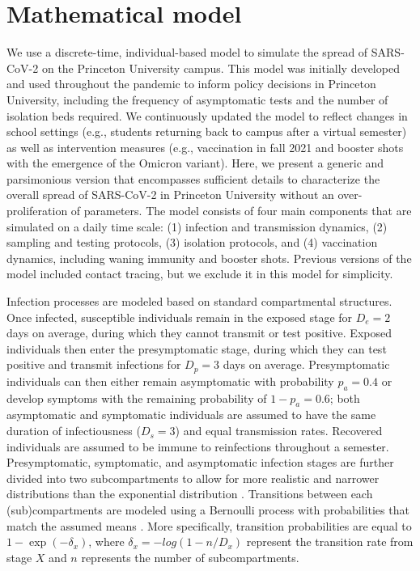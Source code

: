 \documentclass[12pt]{article}
\begin{document}
\section*{Mathematical model}

We use a discrete-time, individual-based model to simulate the spread of SARS-CoV-2 on the Princeton University campus.
This model was initially developed and used throughout the pandemic to inform policy decisions in Princeton University, including the frequency of asymptomatic tests and the number of isolation beds required.
We continuously updated the model to reflect changes in school settings (e.g., students returning back to campus after a virtual semester) as well as intervention measures (e.g., vaccination in fall 2021 and booster shots with the emergence of the Omicron variant).
Here, we present a generic and parsimonious version that encompasses sufficient details to characterize the overall spread of SARS-CoV-2 in Princeton University without an over-proliferation of parameters.
The model consists of four main components that are simulated on a daily time scale: (1) infection and transmission dynamics, (2) sampling and testing protocols, (3) isolation protocols, and (4) vaccination dynamics, including waning immunity and booster shots.
Previous versions of the model included contact tracing, but we exclude it in this model for simplicity.

Infection processes are modeled based on standard compartmental structures.
Once infected, susceptible individuals remain in the exposed stage for $D_e = 2$ days on average, during which they cannot transmit or test positive. 
Exposed individuals then enter the presymptomatic stage, during which they can test positive and transmit infections for $D_p = 3$ days on average.
Presymptomatic individuals can then either remain asymptomatic with probability $p_a = 0.4$ or develop symptoms with the remaining probability of $1-p_a = 0.6$; both asymptomatic and symptomatic individuals are assumed to have the same duration of infectiousness ($D_s=3$) and equal transmission rates.
Recovered individuals are assumed to be immune to reinfections throughout a semester.
Presymptomatic, symptomatic, and asymptomatic infection stages are further divided into two subcompartments to allow for more realistic and narrower distributions than the exponential distribution \citep{brett2020transmission}.
Transitions between each (sub)compartments are modeled using a Bernoulli process with probabilities that match the assumed means \citep{he2010plug}.
More specifically, transition probabilities are equal to $1 - \exp(-\delta_x)$, where $\delta_x = -log(1-n/D_x)$ represent the transition rate from stage $X$ and $n$ represents the number of subcompartments.
\end{document}
